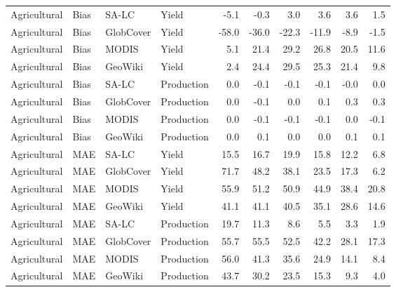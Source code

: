 \begin{longtable}{llllrrrrrr}
  Agricultural & Bias & SA-LC & Yield & -5.1 & -0.3 & 3.0 & 3.6 & 3.6 & 1.5 \\ 
  Agricultural & Bias & GlobCover & Yield & -58.0 & -36.0 & -22.3 & -11.9 & -8.9 & -1.5 \\ 
  Agricultural & Bias & MODIS & Yield & 5.1 & 21.4 & 29.2 & 26.8 & 20.5 & 11.6 \\ 
  Agricultural & Bias & GeoWiki & Yield & 2.4 & 24.4 & 29.5 & 25.3 & 21.4 & 9.8 \\ 
  Agricultural & Bias & SA-LC & Production & 0.0 & -0.1 & -0.1 & -0.1 & -0.0 & 0.0 \\ 
  Agricultural & Bias & GlobCover & Production & 0.0 & -0.1 & 0.0 & 0.1 & 0.3 & 0.3 \\ 
  Agricultural & Bias & MODIS & Production & 0.0 & -0.1 & -0.1 & -0.1 & 0.0 & -0.1 \\ 
  Agricultural & Bias & GeoWiki & Production & 0.0 & 0.1 & 0.0 & 0.0 & 0.1 & 0.1 \\ 
  Agricultural & MAE & SA-LC & Yield & 15.5 & 16.7 & 19.9 & 15.8 & 12.2 & 6.8 \\ 
  Agricultural & MAE & GlobCover & Yield & 71.7 & 48.2 & 38.1 & 23.5 & 17.3 & 6.2 \\ 
  Agricultural & MAE & MODIS & Yield & 55.9 & 51.2 & 50.9 & 44.9 & 38.4 & 20.8 \\ 
  Agricultural & MAE & GeoWiki & Yield & 41.1 & 41.1 & 40.5 & 35.1 & 28.6 & 14.6 \\ 
  Agricultural & MAE & SA-LC & Production & 19.7 & 11.3 & 8.6 & 5.5 & 3.3 & 1.9 \\ 
  Agricultural & MAE & GlobCover & Production & 55.7 & 55.5 & 52.5 & 42.2 & 28.1 & 17.3 \\ 
  Agricultural & MAE & MODIS & Production & 56.0 & 41.3 & 35.6 & 24.9 & 14.1 & 8.4 \\ 
  Agricultural & MAE & GeoWiki & Production & 43.7 & 30.2 & 23.5 & 15.3 & 9.3 & 4.0 \\ 
   \hline
\hline
\end{longtable}
